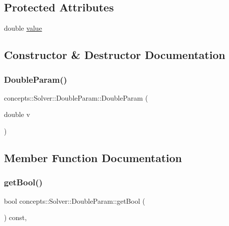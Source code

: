 \subsection*{Protected Attributes}
\begin{DoxyCompactItemize}
\item 
double \hyperlink{classconcepts_1_1_solver_1_1_double_param_af41548e144e9d6e09188c969740d3507}{value}
\end{DoxyCompactItemize}


\subsection{Constructor \& Destructor Documentation}
\mbox{\label{classconcepts_1_1_solver_1_1_double_param_a4f432bf3bd5872439e9d04245f016608}} 
\subsubsection{\texorpdfstring{Double\+Param()}{DoubleParam()}}
{\footnotesize\ttfamily concepts\+::\+Solver\+::\+Double\+Param\+::\+Double\+Param (\begin{DoxyParamCaption}\item[{double}]{v }\end{DoxyParamCaption})\hspace{0.3cm}{\ttfamily [inline]}}



\subsection{Member Function Documentation}
\mbox{\label{classconcepts_1_1_solver_1_1_double_param_a59c7fa9b821c071f13d6182d6b525473}} 
\subsubsection{\texorpdfstring{get\+Bool()}{getBool()}}
{\footnotesize\ttfamily bool concepts\+::\+Solver\+::\+Double\+Param\+::get\+Bool (\begin{DoxyParamCaption}{ }\end{DoxyParamCaption}) const\hspace{0.3cm}{\ttfamily [inline]}, {\ttfamily [virtual]}}



